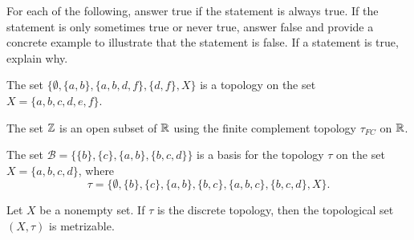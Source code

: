 \begin{comment}
\item Every polynomial in $\mathcal{P}_1$ has the form $ax+b$ where $a, b \in \R$. If $a \neq 0$, the only way $ax+b$ can have zeros is if $b = 0$. If $a \neq 0$ then the zeros of $ax+b$ are the same as the zeros of $x + \frac{b}{a}$. From this perspective we can just consider monic polynomials in $\mathcal{P}_1$. 

Let $O$ be an open set in $\R$ with the cofinite topology. Then $\R \setminus O$ is finite. Let $\R \setminus O = \{a_1, a_2, \ldots, a_k\}$. Let $f(x) = (x-a_1)(x-a_2) \cdots (x-a_k)$. Then $Z(f) = \R \setminus O$ and $\R \setminus Z(f) = O$. Thus, every set that is open in the cofinite topology is open in the Zariski topology.

To show that every open set in the Zariski topology is open in the cofinite topology, it suffices to show that this is true for the basis elements in the Zariski topology. Let $B = \R \setminus Z(f)$ be an open basis element in the Zariski topology, where $f$ is some polynomial in $\mathcal{P}_n$. Since $f$ can have only finitely many roots, the set $\R \setminus B = Z(f)$ is finite, and so $B$ is open in the cofinite topology. We conclude that the Zariski topology and cofinite topology are the same when $n =1$. Note that argument will not be valid when $n \geq 2$ because $Z(f)$ can be an infinite set.   

\ea

\end{comment}

\item For each of the following, answer true if the statement is always true. If the statement is only sometimes true or never true, answer false and provide a concrete example to illustrate that the statement is false. If a statement is true, explain why. 
	\ba
	\item The set $\{\emptyset, \{a,b\}, \{a,b,d,f\}, \{d,f\},X\}$ is a topology on the set $X = \{a,b,c,d,e,f\}$.

	\item  The set $\mathbb{Z}$ is an open subset of $\mathbb{R}$ using the finite complement topology $\tau_{FC}$ on $\mathbb{R}$.

	\item The set $\mathcal{B} = \{\{b\},\{c\}, \{a,b\}, \{b,c,d\}\}$ is a basis for the topology $\tau$ on the set $X = \{a,b,c,d\}$, where 
\[\tau = \{\emptyset, \{b\}, \{c\}, \{a,b\}, \{b,c\}, \{a,b,c\}, \{b,c,d\}, X\}.\]

	\item Let $X$ be a nonempty set. If $\tau$ is the discrete topology, then the topological set $(X,\tau)$ is metrizable.  

